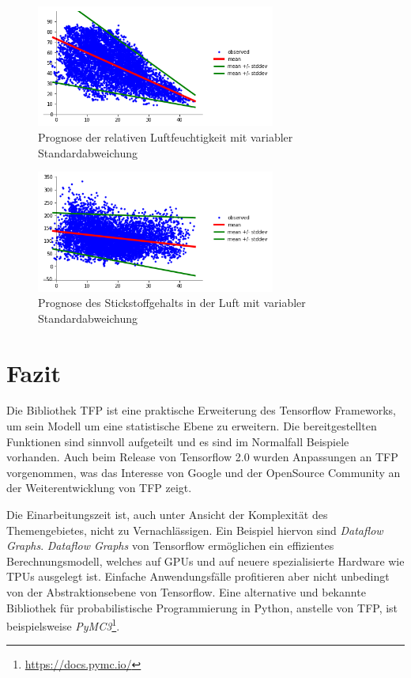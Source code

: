 \documentclass[12pt]{article}
\begin{document}
\begin{figure}[h]
    \centering
    \includegraphics[width=0.7\textwidth]{./figs/with_unc_rh.png}
    \caption{Prognose der relativen Luftfeuchtigkeit mit variabler Standardabweichung}
    \label{fig:with_unc_rh}
\end{figure}

\begin{figure}[h]
    \centering
    \includegraphics[width=0.7\textwidth]{./figs/with_unc_no2.png}
    \caption{Prognose des Stickstoffgehalts in der Luft mit variabler Standardabweichung}
    \label{fig:with_unc_no2}
\end{figure}


\section{Fazit}

Die Bibliothek TFP ist eine praktische Erweiterung des Tensorflow Frameworks, um sein Modell um eine statistische Ebene zu erweitern. Die bereitgestellten Funktionen sind sinnvoll aufgeteilt und es sind im Normalfall Beispiele vorhanden. Auch beim Release von Tensorflow 2.0 wurden Anpassungen an TFP vorgenommen, was das Interesse von Google und der OpenSource Community an der Weiterentwicklung von TFP zeigt. 

Die Einarbeitungszeit ist, auch unter Ansicht der Komplexität des Themengebietes, nicht zu Vernachlässigen. Ein Beispiel hiervon sind \textit{Dataflow Graphs}. \textit{Dataflow Graphs} von Tensorflow ermöglichen ein effizientes Berechnungsmodell, welches auf GPUs und auf neuere spezialisierte Hardware wie TPUs ausgelegt ist. Einfache Anwendungsfälle profitieren aber nicht unbedingt von der Abstraktionsebene von Tensorflow. Eine alternative und bekannte Bibliothek für probabilistische Programmierung in Python, anstelle von TFP, ist beispielsweise \textit{PyMC3}\footnote{\url{https://docs.pymc.io/}}.
\end{document}
